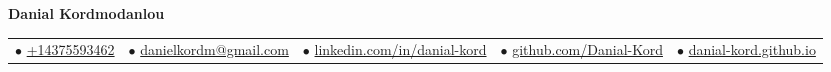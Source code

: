 \documentclass{article}
\begin{document}
    \fontsize{9}{13.5}
    \selectfont
    \begin{center}
        \begin{center}
            \Huge\bfseries Danial Kordmodanlou
        \end{center}
            \begin{tabular}{c c c c c}
               $\bullet$ \href{tel:+14375593462}{+14375593462}  & 
              $\bullet$  \href{mailto:danielkordm@gmail.com}{danielkordm@gmail.com}  & 
              $\bullet$  \href{https://www.linkedin.com/in/danial-kord/}{linkedin.com/in/danial-kord} & 
              $\bullet$  \href{https://github.com/Danial-Kord}{github.com/Danial-Kord} &  
              $\bullet$ \href{https://danial-kord.github.io/}{danial-kord.github.io} \\
        \end{tabular}
    \end{center}    
    \vspace{-0.75em}
    
    
    
    
    
    
  
\end{document}
